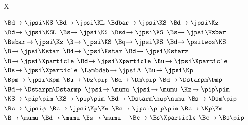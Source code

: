 
\newmathsymbol{\BF}           {\xspace}
\newmathsymbol{\BR}           {\BF}

\renewcommand{\to}            {\ensuremath{\rightarrow}\xspace}
\newcommand{\decay}[2]        {\ensuremath{#1\!\to #2}\xspace}
\newcommand{\decaybf}[2]      {\ensuremath{#1\!\pmb{\to} #2}\xspace} %

\newmathsymbol{\Xparticle}      {X\xspace}

\newmathsymbol{\BdToJpsiKS}      {\decay{\Bd}{\jpsi\KS}}
\newmathsymbol{\BdToJpsiKL}      {\decay{\Bd}{\jpsi\KL}}
\newmathsymbol{\BdbarToJpsiKS}   {\decay{\Bdbar}{\jpsi\KS}}
\newmathsymbol{\BdToJpsiKz}      {\decay{\Bd}{\jpsi\Kz}}
\newmathsymbol{\BdbarToJpsiKzbar}{\decay{\Bdbar}{\jpsi\Kzbar}}
\newmathsymbol{\BdToJpsiKSL}     {\decay{\Bd}{\jpsi\KSL}}
\newmathsymbol{\BsToJpsiKS}      {\decay{\Bs}{\jpsi\KS}}
\newmathsymbol{\BsdToJpsiKS}     {\decay{\Bsd}{\jpsi\KS}}
\newmathsymbol{\BsToJpsiKzbar}   {\decay{\Bs}{\jpsi\Kzbar}}
\newmathsymbol{\BsbarToJpsiKz}   {\decay{\Bsbar}{\jpsi\Kz}}
\newmathsymbol{\BToJpsiKS}       {\decay{\B}{\jpsi\KS}}
\newmathsymbol{\BqToJpsiKS}      {\decay{\Bq}{\jpsi\KS}}
\newmathsymbol{\BdToPsiTwoSKS}   {\decay{\Bd}{\psitwos\KS}}
\newmathsymbol{\BToJpsiKstar}    {\decay{\B}{\jpsi\Kstar}}
\newmathsymbol{\BdToJpsiKstar}   {\decay{\Bd}{\jpsi\Kstar}}
\newmathsymbol{\BdToJpsiKstarz}  {\decay{\Bd}{\jpsi\Kstarz}}
\newmathsymbol{\BToJpsiX}        {\decay{\B}{\jpsi\Xparticle}}
\newmathsymbol{\BdToJpsiX}       {\decay{\Bd}{\jpsi\Xparticle}}
\newmathsymbol{\BuToJpsiX}       {\decay{\Bu}{\jpsi\Xparticle}}
\newmathsymbol{\BsToJpsiX}       {\decay{\Bs}{\jpsi\Xparticle}}
\newmathsymbol{\LbToJpsiLambda}  {\decay{\Lambdab}{\jpsi\Lambda}}
\newmathsymbol{\BuToJpsiK}       {\decay{\Bu}{\jpsi\Kp}}
\newmathsymbol{\BuToJpsiKcc}     {\decay{\Bpm}{\jpsi\Kpm}}
\newmathsymbol{\BuToDpi}         {\decay{\Bu}{\Dz\pip}}
\newmathsymbol{\BdToDpi}         {\decay{\Bd}{\Dm\pip}}
\newmathsymbol{\BdToDstarD}      {\decay{\Bd}{\Dstarpm\Dmp}}
\newmathsymbol{\BdToDstarDstar}  {\decay{\Bd}{\Dstarpm\Dstarmp}}
\newmathsymbol{\JpsiToMuMu}      {\decay{\jpsi}{\mumu}}
\newmathsymbol{\JpsiTomumu}      {\decay{\jpsi}{\mumu}}
\newmathsymbol{\KzToPiPi}        {\decay{\Kz}{\pip\pim}}
\newmathsymbol{\KSToPiPi}        {\decay{\KS}{\pip\pim}}
\newmathsymbol{\KSTopipi}        {\decay{\KS}{\pip\pim}}
\newmathsymbol{\BdToDstarmunu}   {\decay{\Bd}{\Dstarm\mup\numu}}
\newmathsymbol{\BsToDspi}        {\decay{\Bs}{\Dsm\pip}}
\newmathsymbol{\BsToJpsiphi}     {\decay{\Bs}{\jpsi\phi}}
\newmathsymbol{\BsToJpsiKK}      {\decay{\Bs}{\jpsi\Kp\Km}}
\newmathsymbol{\BsToJpsipipi}    {\decay{\Bs}{\jpsi\pip\pim}}
\newmathsymbol{\BsToKK}          {\decay{\Bs}{\Kp\Km}}
\newmathsymbol{\BToMuMu}         {\decay{\B}{\mumu}}
\newmathsymbol{\BdToMuMu}        {\decay{\Bd}{\mumu}}
\newmathsymbol{\BsToMuMu}        {\decay{\Bs}{\mumu}}
\newmathsymbol{\inclJPsi}        {\ \jpsi}
\newmathsymbol{\BcToBsX}         {\decay{\Bc}{\Bs\Xparticle}}
\newmathsymbol{\BcToBspi}        {\decay{\Bc}{\Bs\pip}}

